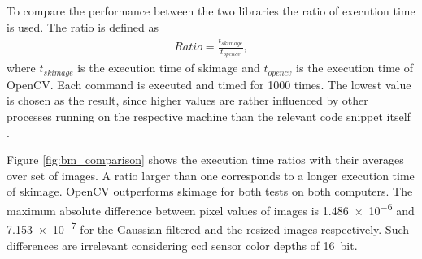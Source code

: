 To compare the performance between the two libraries the ratio of execution time is used. The ratio is defined as
\begin{align}
    Ratio = \frac{t_{skimage}}{t_{opencv}}, \label{eq:bm_exec_ratio}
\end{align}
where $t_{skimage}$ is the execution time of \gls{skimage} and $t_{opencv}$ is the execution time of OpenCV. Each command is executed and timed for 1000 times. The lowest value is chosen as the result, since higher values are rather influenced by other processes running on the respective machine than the relevant code snippet itself \cite{timeit2020}.

Figure \ref{fig:bm_comparison} shows the execution time ratios with their averages over set of images. A ratio larger than one corresponds to a longer execution time of \gls{skimage}. OpenCV outperforms \gls{skimage} for both tests on both computers. The maximum absolute difference between pixel values of images is \SI{1.486e-6}{} and \SI{7.153e-7}{} for the Gaussian filtered and the resized images respectively. Such differences are irrelevant considering \gls{ccd} sensor color depths of \SI{16}{bit}.


